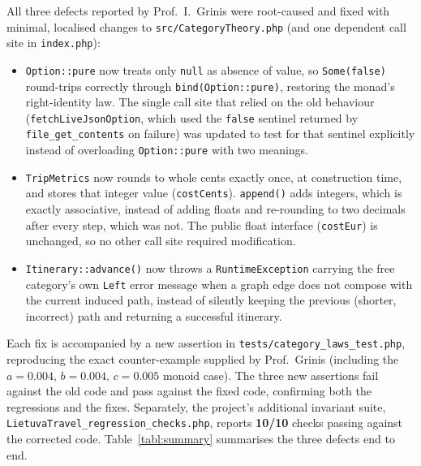 All three defects reported by Prof.~I.~Grinis were root-caused and fixed with minimal, localised changes to \texttt{src/CategoryTheory.php} (and one dependent call site in \texttt{index.php}):

\begin{itemize}
  \item \texttt{Option::pure} now treats only \texttt{null} as absence of value, so \texttt{Some(false)} round-trips correctly through \texttt{bind(Option::pure)}, restoring the monad's right-identity law. The single call site that relied on the old behaviour (\texttt{fetchLiveJsonOption}, which used the \texttt{false} sentinel returned by \texttt{file\_get\_contents} on failure) was updated to test for that sentinel explicitly instead of overloading \texttt{Option::pure} with two meanings.
  \item \texttt{TripMetrics} now rounds to whole cents exactly once, at construction time, and stores that integer value (\texttt{costCents}). \texttt{append()} adds integers, which is exactly associative, instead of adding floats and re-rounding to two decimals after every step, which was not. The public float interface (\texttt{costEur}) is unchanged, so no other call site required modification.
  \item \texttt{Itinerary::advance()} now throws a \texttt{RuntimeException} carrying the free category's own \texttt{Left} error message when a graph edge does not compose with the current induced path, instead of silently keeping the previous (shorter, incorrect) path and returning a successful itinerary.
\end{itemize}

Each fix is accompanied by a new assertion in \texttt{tests/category\_laws\_test.php}, reproducing the exact counter-example supplied by Prof.~Grinis (including the $a=0.004,\,b=0.004,\,c=0.005$ monoid case). The three new assertions fail against the old code and pass against the fixed code, confirming both the regressions and the fixes. Separately, the project's additional invariant suite, \texttt{LietuvaTravel\_regression\_checks.php}, reports \textbf{10/10} checks passing against the corrected code. Table~\ref{tabl:summary} summarises the three defects end to end.

